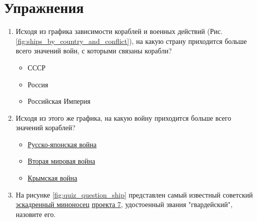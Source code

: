 \section{Упражнения}

\begin{enumerate}
  \item Исходя из графика зависимости кораблей и военных действий (Рис. \ref{fig:ships_by_country_and_conflict}), на какую страну приходится больше всего значений войн, с которыми связаны корабли?
  \begin{itemize}
    \item СССР
    \item Россия
    \item Российская Империя
  \end{itemize}

  \item Исходя из этого же графика, на какую войну приходится больше всего значений кораблей?
  \begin{itemize}
    \item \href{https://www.wikidata.org/wiki/Q159950}{Русско-японская война}
    \item \href{https://www.wikidata.org/wiki/Q362}{Вторая мировая война}
    \item \href{https://www.wikidata.org/wiki/Q254106}{Крымская война}
  \end{itemize}

  \item На рисунке \ref{fig:quiz_question_ship} представлен самый известный советский \href{https://ru.wikipedia.org/wiki/Эскадренный_миноносец}{эскадренный миноносец} \href{https://ru.wikipedia.org/wiki/Эскадренные_миноносцы_проекта_7}{проекта 7}, удостоенный звания "гвардейский", назовите его.
  
  \begin{marginfigure}[0.0cm]
    {
      \setlength{\fboxsep}{0pt}%
      \setlength{\fboxrule}{1pt}%
    }
    \caption{Известный советский эскадренный миноносец проекта 7.}%
    \label{fig:quiz_question_ship}%
  \end{marginfigure}
\end{enumerate}


\begin{figure*}[h]
  {
  \setlength{\fboxsep}{0pt}%
  \setlength{\fboxrule}{1pt}%
  }
    \caption{Список кораблей, связанных с Россией и участвовавших в военных конфликтах (2020)}%
    \label{fig:ships_by_country_and_conflict}%
\end{figure*}